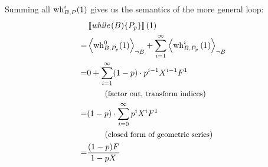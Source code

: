 Summing all $\operatorname{wh}_{B, P}^i(1)$ gives us the semantics of the more general loop:
\begin{align*}
	 & \left\llbracket \textit{while}\,(B) \{P_p\} \right\rrbracket(1) \\
	=& \left\langle \operatorname{wh}_{B, P_p}^0(1) \right\rangle_{\lnot B}
		+ \sum_{i = 1}^{\infty}
			\left\langle \operatorname{wh}_{B, P_p}^i \left(1\right) \right\rangle_{\lnot B} \\
	=& 0 + \sum_{i = 1}^{\infty} (1-p) \cdot p^{i-1} X^{i-1} F^1 \\
	 & \hspace*{2em} \left(\text{\small factor out, transform indices}\right) \\
	=& (1-p) \cdot \sum_{i = 0}^{\infty} p^i X^i F^1 \\
	 & \hspace*{2em} \left(\text{\small closed form of geometric series}\right) \\
	=& \frac{(1-p) F}{1 - p X}
\end{align*}